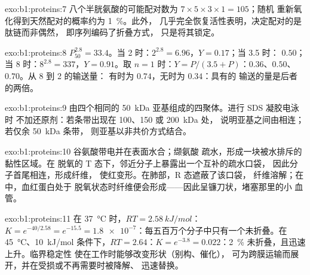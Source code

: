 \begin{solution}{exo:b1:proteins:7}
八个半胱氨酸的可能配对数为 $7\times 5\times 3\times 1 = 105$；随机
重新氧化得到天然配对的概率约为 \qty{1}{\%}。此外，
几乎完全恢复活性表明，决定配对的是肽链而非偶然，
即序列编码了折叠方式，
只是将其锁定。
\end{solution}

\begin{solution}{exo:b1:proteins:8}
$P_{50}^{2.8} = 33.4$。当 2 时：$2^{2.8} = 6.96$，$Y = 0.17$；当 3.5 时：
$0.50$；当 8 时：$8^{2.8} = 337$，$Y = 0.91$。取 $n = 1$ 时：$Y =
P/(3.5 + P)$：$0.36$、$0.50$、$0.70$。从 8 到 2 的输送量：
有时为 $0.74$，无时为 $0.34$：具有的
输送的量是后者的两倍。
\end{solution}

\begin{solution}{exo:b1:proteins:9}
由四个相同的 \qty{50}{kDa} 亚基组成的四聚体。进行 SDS 凝胶电泳时
不加还原剂：若条带出现在 100、150 或 \qty{200}{kDa} 处，
说明亚基之间由相连；若仅余 \qty{50}{kDa} 条带，
则亚基以非共价方式结合。
\end{solution}

\begin{solution}{exo:b1:proteins:10}
谷氨酸带电并在表面水合；缬氨酸
疏水，形成一块被水排斥的黏性区域。在
脱氧的 T 态下，邻近分子上暴露出一个互补的疏水口袋，
因此分子首尾相连，形成纤维，
使红变形。在肺部，R 态遮蔽了该口袋，
纤维溶解；在中，血红蛋白处于
脱氧状态时纤维便会形成——因此呈镰刀状，堵塞那里的小
血管。
\end{solution}

\begin{solution}{exo:b1:proteins:11}
在 \qty{37}{\celsius} 时，$RT = \qty{2.58}{kJ/mol}$：$K = e^{-40/2.58} =
e^{-15.5} = \num{1.8e-7}$：每五百万个分子中只有一个未折叠。在
\qty{45}{\celsius}、\qty{10}{kJ/mol} 条件下，$RT = 2.64$：$K = e^{-3.8} =
0.022$：\qty{2}{\%} 未折叠，且迅速上升。临界稳定性
使在工作时能够改变形状（别构、催化），
可为跨膜运输而展开，并在受损或不再需要时被降解、
迅速替换。
\end{solution}

